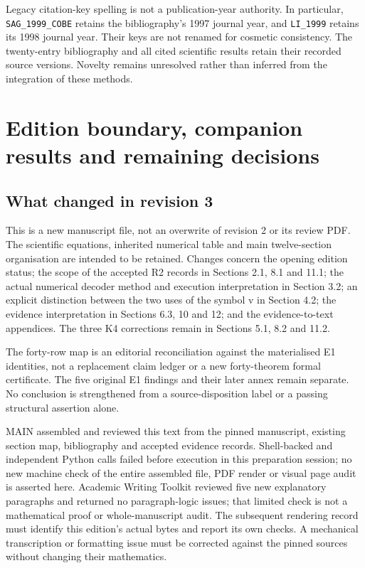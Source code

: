 \documentclass[
  11pt,
  a4paper]{article}
\begin{document}
Legacy citation-key spelling is not a publication-year authority. In particular, \texttt{SAG\_1999\_COBE} retains the bibliography's 1997 journal year, and \texttt{LI\_1999} retains its 1998 journal year. Their keys are not renamed for cosmetic consistency. The twenty-entry bibliography and all cited scientific results retain their recorded source versions. Novelty remains unresolved rather than inferred from the integration of these methods.

\hypertarget{appendix-d.-edition-boundary-companion-results-and-remaining-decisions}{%
\section{Edition boundary, companion results and remaining decisions}\label{appendix-d.-edition-boundary-companion-results-and-remaining-decisions}}

\hypertarget{d.1-what-changed-in-revision-3}{%
\subsection{What changed in revision 3}\label{d.1-what-changed-in-revision-3}}

This is a new manuscript file, not an overwrite of revision 2 or its review PDF. The scientific equations, inherited numerical table and main twelve-section organisation are intended to be retained. Changes concern the opening edition status; the scope of the accepted R2 records in Sections 2.1, 8.1 and 11.1; the actual numerical decoder method and execution interpretation in Section 3.2; an explicit distinction between the two uses of the symbol v in Section 4.2; the evidence interpretation in Sections 6.3, 10 and 12; and the evidence-to-text appendices. The three K4 corrections remain in Sections 5.1, 8.2 and 11.2.

The forty-row map is an editorial reconciliation against the materialised E1 identities, not a replacement claim ledger or a new forty-theorem formal certificate. The five original E1 findings and their later annex remain separate. No conclusion is strengthened from a source-disposition label or a passing structural assertion alone.

MAIN assembled and reviewed this text from the pinned manuscript, existing section map, bibliography and accepted evidence records. Shell-backed and independent Python calls failed before execution in this preparation session; no new machine check of the entire assembled file, PDF render or visual page audit is asserted here. Academic Writing Toolkit reviewed five new explanatory paragraphs and returned no paragraph-logic issues; that limited check is not a mathematical proof or whole-manuscript audit. The subsequent rendering record must identify this edition's actual bytes and report its own checks. A mechanical transcription or formatting issue must be corrected against the pinned sources without changing their mathematics.
\end{document}
